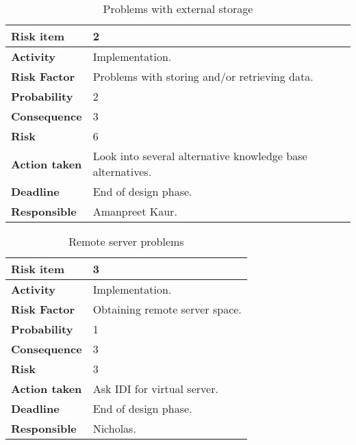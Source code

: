 \begin{table}[htdp]

\begin{center}
\begin{tabularx}{\textwidth}{| X | X |}
\hline
\textbf{Risk item} & 2 \\
\hline
\textbf{Activity} & Implementation. \\
\hline
\textbf{Risk Factor} & Problems with storing and/or retrieving data. \\
\hline
\textbf{Probability} & 2 \\
\hline
\textbf{Consequence} & 3 \\
\hline
\textbf{Risk} & 6 \\
\hline
\textbf{Action taken} & Look into several alternative knowledge base alternatives.  \\
\hline
\textbf{Deadline} & End of design phase. \\
\hline
\textbf{Responsible} & Amanpreet Kaur. \\
\hline
\end{tabularx}
\caption{Problems with external storage}
\end{center}
\label{risk_4}
\end{table}

\begin{table}[htdp]

\begin{center}
\begin{tabularx}{\textwidth}{| X | X |}
\hline
\textbf{Risk item} & 3 \\
\hline
\textbf{Activity} & Implementation.  \\
\hline
\textbf{Risk Factor} & Obtaining remote server space. \\
\hline
\textbf{Probability} & 1 \\
\hline
\textbf{Consequence} & 3 \\
\hline
\textbf{Risk} & 3 \\
\hline
\textbf{Action taken} & Ask IDI for virtual server. \\
\hline
\textbf{Deadline} & End of design phase. \\
\hline
\textbf{Responsible} & Nicholas. \\
\hline
\end{tabularx}
\caption{Remote server problems}
\end{center}
\label{risk_5}
\end{table}



